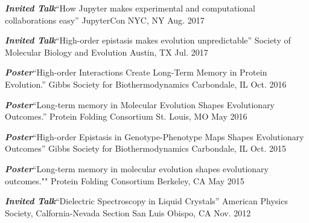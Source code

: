 
\begin{cvpresentations}

  \cvpresentation
    {\textbf{\textit{Invited Talk}}{\enskip\cdotp\enskip}``How Jupyter makes experimental and computational collaborations easy''} %
    {JupyterCon} %
    {NYC, NY} %
    {Aug. 2017} %

  \cvpresentation
    {\textbf{\textit{Invited Talk}}{\enskip\cdotp\enskip}``High-order epistasis makes evolution unpredictable''} %
    {Society of Molecular Biology and Evolution} %
    {Austin, TX} %
    {Jul. 2017} %

  \cvpresentation
    {\textbf{\textit{Poster}}{\enskip\cdotp\enskip}``High-order Interactions Create Long-Term Memory in Protein Evolution.''} %
    {Gibbs Society for Biothermodynamics} %
    {Carbondale, IL} %
    {Oct. 2016} %

  \cvpresentation
    {\textbf{\textit{Poster}}{\enskip\cdotp\enskip}``Long-term memory in Molecular Evolution Shapes Evolutionary Outcomes.''} %
    {Protein Folding Consortium} %
    {St. Louis, MO} %
    {May 2016} %

  \cvpresentation
    {\textbf{\textit{Poster}}{\enskip\cdotp\enskip}``High-order Epistasis in Genotype-Phenotype Maps Shapes Evolutionary Outcomes''} %
    {Gibbs Society for Biothermodynamics} %
    {Carbondale, IL} %
    {Oct. 2015} %

  \cvpresentation
    {\textbf{\textit{Poster}}{\enskip\cdotp\enskip}``Long-term memory in molecular evolution shapes evolutionary outcomes.""} %
    {Protein Folding Consortium} %
    {Berkeley, CA} %
    {May 2015} %

  \cvpresentation
    {\textbf{\textit{Invited Talk}}{\enskip\cdotp\enskip}``Dielectric Spectroscopy in Liquid Crystals''} %
    {American Physics Society, Calfornia-Nevada Section} %
    {San Luis Obispo, CA} %
    {Nov. 2012} %

\end{cvpresentations}
